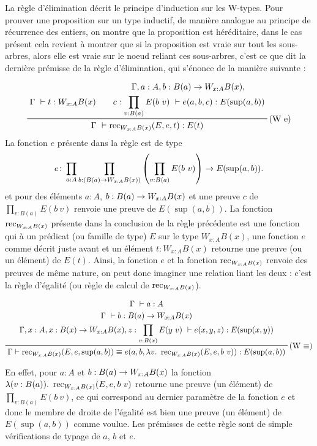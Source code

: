 \documentclass[../../rapport.tex]{subfiles}
\begin{document}
  La règle d'élimination décrit le principe d'induction sur les W-types.
  Pour prouver une proposition sur un type inductif, de manière analogue au principe de récurrence des entiers,
  on montre que la proposition est héréditaire, dans le cas présent cela revient à montrer que si la proposition est vraie
  sur tout les sous-arbres, alors elle est vraie sur le noeud reliant ces sous-arbres, c'est ce que dit la dernière prémisse
  de la règle d'élimination, qui s'énonce de la manière suivante :

  $$
  \prfinterspace=2em
  \prftree[r]{(W e)}
  {\Gamma\ \vdash t : W_{x:A}B(x)}
  {
    \prfStackPremises
    {\Gamma, a : A, b : B(a) \fun W_{x:A}B(x),}
    {c : \prod_{v:B(a)}{E(b\ v)}\ \vdash e(a, b, c) : E(\sup(a, b))}
  }
  {\Gamma\ \vdash \rec_{W_{x:A}B(x)}(E, e, t) : E(t)}
  $$
  La fonction $e$ présente dans la règle est de type
  $$e \colon \prod_{a:A}\prod_{b:(B(a) \rightarrow W_{x:A}B(x))}\left(\prod_{v:B(a)}E(b\ v)\right) \rightarrow E(\sup(a, b)).$$
  et pour des éléments $a : A$, $b : B(a) \rightarrow W_{x:A}B(x)$ et une preuve $c$ de $\prod_{v:B(a)}{E(b\ v)}$
  renvoie une preuve de $E(\sup(a, b))$.
  La fonction $\operatorname{rec}_{W_{x:A}B(x)}$ présente dans la conclusion de la règle précédente est une fonction qui à un prédicat
  (ou famille de type) $E$ sur le type $W_{x:A}B(x)$, une fonction $e$ comme décrit juste avant et un élément $t : W_{x:A}B(x)$
  retourne une preuve (ou un élément) de $E(t)$. Ainsi, la fonction $e$ et la fonction $\operatorname{rec}_{W_{x:A}B(x)}$ renvoie des preuves de même nature,
  on peut donc imaginer une relation liant les deux : c'est la règle d'égalité (ou règle de calcul de $\operatorname{rec}_{W_{x:A}B(x)}$).

  $$
  \prfinterspace=2em
  \prftree[r]{(W $\equiv$)}
    {\prfStackPremises
      {\Gamma\ \vdash a : A}
      {\Gamma\ \vdash b : B(a) \fun W_{x:A}B(x)}
      {\Gamma, x : A, x : B(x) \fun W_{x:A}B(x), z : \prod_{v:B(x)}{E(y\ v)}\ \vdash e(x, y, z) : E(\sup(x, y))}
    }
      {\Gamma \vdash \rec_{W_{x:A}B(x)}(E, e, \sup(a, b)) \equiv e(a, b, \lambda v.\ \rec_{W_{x:A}B(x)}(E, e, b\ v)) : E(\sup(a, b))}
  $$

  En effet, pour $a : A$ et $b : B(a) \rightarrow W_{x:A}B(x)$ la fonction $\lambda(v : B(a)).\ \operatorname{rec}_{W_{x:A}B(x)}(E, e, b\ v)$
  retourne une preuve (un élément) de $\prod_{v : B(a)}{E(b \ v)}$, ce qui correspond au
  dernier paramètre de la fonction $e$ et donc le membre de droite de l'égalité est bien une preuve (un élément)
  de $E(\sup(a, b))$ comme voulue.
  Les prémisses de cette règle sont de simple vérifications de typage de $a$, $b$ et $e$.
\end{document}
